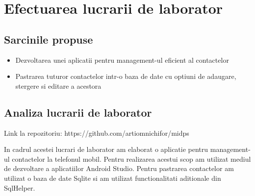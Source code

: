 \section{Efectuarea lucrarii de laborator}

\subsection{Sarcinile propuse}
\begin{itemize}
	\item Dezvoltarea unei aplicatii pentru management-ul eficient al contactelor
	\item Pastrarea tuturor contactelor intr-o baza de date cu optiuni de adaugare, stergere si editare a acestora
\end{itemize}


\subsection{Analiza lucrarii de laborator}

Link la repozitoriu: https://github.com/artiomnichifor/midps
		
	In cadrul acestei lucrari de laborator am elaborat o aplicatie pentru management-ul contactelor la telefonul mobil. Pentru realizarea acestui scop am utilizat mediul de dezvoltare a aplicatiilor Android Studio. Pentru pastrarea contactelor am utilizat o baza de date Sqlite si am utilizat functionalitati aditionale din SqlHelper.

